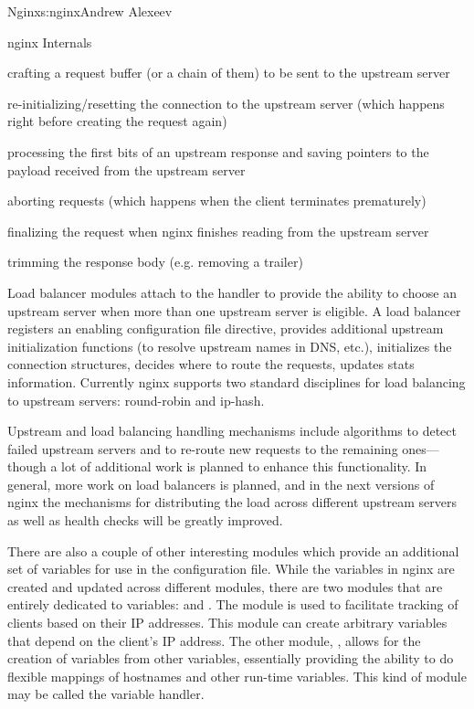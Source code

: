 \begin{aosachapter}{Nginx}{s:nginx}{Andrew Alexeev}
\begin{aosasect1}{nginx Internals}
\begin{aosaitemize}

\item crafting a request buffer (or a chain of them) to be sent to the
  upstream server

\item re-initializing/resetting the connection to the upstream server
  (which happens right before creating the request again)

\item processing the first bits of an upstream response and saving
  pointers to the payload received from the upstream server

\item aborting requests (which happens when the client terminates
  prematurely)

\item finalizing the request when nginx finishes reading from the
  upstream server

\item trimming the response body (e.g. removing a trailer)

\end{aosaitemize}

Load balancer modules attach to the  handler to
provide the ability to choose an upstream server when more than one
upstream server is eligible. A load balancer registers an enabling
configuration file directive, provides additional upstream
initialization functions (to resolve upstream names in DNS, etc.),
initializes the connection structures, decides where to route the
requests, updates stats %
information. Currently nginx supports two standard disciplines for
load balancing to upstream servers: round-robin and ip-hash.

Upstream and load balancing handling mechanisms include algorithms to
detect failed upstream servers and to re-route new requests to the
remaining ones---though a lot of additional work is planned to enhance
this functionality. In general, more work on load balancers is
planned, and in the next versions of nginx the mechanisms for
distributing the load across different upstream servers as well as
health checks will be greatly improved.

There are also a couple of other interesting modules which provide an
additional set of variables for use in the configuration file. While
the variables in nginx are created and updated across different
modules, there are two modules that are entirely dedicated to
variables:  and . The  module is used to
facilitate tracking of clients based on their IP addresses. This
module can create arbitrary variables that depend on the client's IP
address. The other module, , allows for the creation of
variables from other variables, essentially providing the ability to
do flexible mappings of hostnames and other run-time variables. This
kind of module may be called the variable handler.


\end{aosasect1}
\end{aosachapter}
